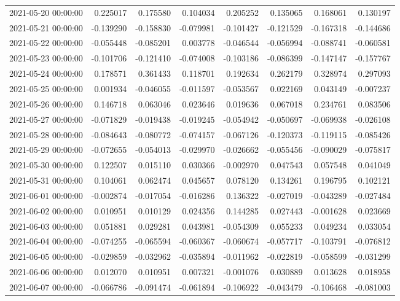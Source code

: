 \begin{tabular}{lrrrrrrr}
2021-05-20 00:00:00 & 0.225017 & 0.175580 & 0.104034 & 0.205252 & 0.135065 & 0.168061 & 0.130197 \\
2021-05-21 00:00:00 & -0.139290 & -0.158830 & -0.079981 & -0.101427 & -0.121529 & -0.167318 & -0.144686 \\
2021-05-22 00:00:00 & -0.055448 & -0.085201 & 0.003778 & -0.046544 & -0.056994 & -0.088741 & -0.060581 \\
2021-05-23 00:00:00 & -0.101706 & -0.121410 & -0.074008 & -0.103186 & -0.086399 & -0.147147 & -0.157767 \\
2021-05-24 00:00:00 & 0.178571 & 0.361433 & 0.118701 & 0.192634 & 0.262179 & 0.328974 & 0.297093 \\
2021-05-25 00:00:00 & 0.001934 & -0.046055 & -0.011597 & -0.053567 & 0.022169 & 0.043149 & -0.007237 \\
2021-05-26 00:00:00 & 0.146718 & 0.063046 & 0.023646 & 0.019636 & 0.067018 & 0.234761 & 0.083506 \\
2021-05-27 00:00:00 & -0.071829 & -0.019438 & -0.019245 & -0.054942 & -0.050697 & -0.069938 & -0.026108 \\
2021-05-28 00:00:00 & -0.084643 & -0.080772 & -0.074157 & -0.067126 & -0.120373 & -0.119115 & -0.085426 \\
2021-05-29 00:00:00 & -0.072655 & -0.054013 & -0.029970 & -0.026662 & -0.055456 & -0.090029 & -0.075817 \\
2021-05-30 00:00:00 & 0.122507 & 0.015110 & 0.030366 & -0.002970 & 0.047543 & 0.057548 & 0.041049 \\
2021-05-31 00:00:00 & 0.104061 & 0.062474 & 0.045657 & 0.078120 & 0.134261 & 0.196795 & 0.102121 \\
2021-06-01 00:00:00 & -0.002874 & -0.017054 & -0.016286 & 0.136322 & -0.027019 & -0.043289 & -0.027484 \\
2021-06-02 00:00:00 & 0.010951 & 0.010129 & 0.024356 & 0.144285 & 0.027443 & -0.001628 & 0.023669 \\
2021-06-03 00:00:00 & 0.051881 & 0.029281 & 0.043981 & -0.054309 & 0.055233 & 0.049234 & 0.033054 \\
2021-06-04 00:00:00 & -0.074255 & -0.065594 & -0.060367 & -0.060674 & -0.057717 & -0.103791 & -0.076812 \\
2021-06-05 00:00:00 & -0.029859 & -0.032962 & -0.035894 & -0.011962 & -0.022819 & -0.058599 & -0.031299 \\
2021-06-06 00:00:00 & 0.012070 & 0.010951 & 0.007321 & -0.001076 & 0.030889 & 0.013628 & 0.018958 \\
2021-06-07 00:00:00 & -0.066786 & -0.091474 & -0.061894 & -0.106922 & -0.043479 & -0.106468 & -0.081003 \\

\end{tabular}
